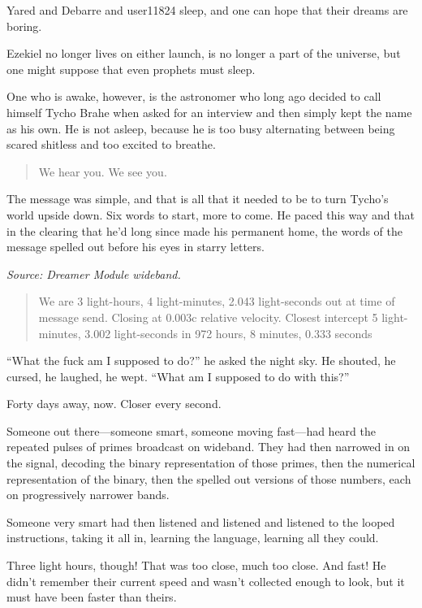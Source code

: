 Yared and Debarre and user11824 sleep, and one can hope that their dreams are boring.

Ezekiel no longer lives on either launch, is no longer a part of the universe, but one might suppose that even prophets must sleep.

One who is awake, however, is the astronomer who long ago decided to call himself Tycho Brahe when asked for an interview and then simply kept the name as his own. He is not asleep, because he is too busy alternating between being scared shitless and too excited to breathe.

\begin{quote}
We hear you. We see you.
\end{quote}

\noindent The message was simple, and that is all that it needed to be to turn Tycho's world upside down. Six words to start, more to come. He paced this way and that in the clearing that he'd long since made his permanent home, the words of the message spelled out before his eyes in starry letters.

\emph{Source: Dreamer Module wideband.}

\begin{quote}
We are 3 light-hours, 4 light-minutes, 2.043 light-seconds out at time of message send. Closing at 0.003c relative velocity. Closest intercept 5 light-minutes, 3.002 light-seconds in 972 hours, 8 minutes, 0.333 seconds
\end{quote}

\noindent ``What the fuck am I supposed to do?'' he asked the night sky. He shouted, he cursed, he laughed, he wept. ``What am I supposed to do with this?''

Forty days away, now. Closer every second.

Someone out there---someone smart, someone moving fast---had heard the repeated pulses of primes broadcast on wideband. They had then narrowed in on the signal, decoding the binary representation of those primes, then the numerical representation of the binary, then the spelled out versions of those numbers, each on progressively narrower bands.

Someone very smart had then listened and listened and listened to the looped instructions, taking it all in, learning the language, learning all they could.

Three light hours, though! That was too close, much too close. And fast! He didn't remember their current speed and wasn't collected enough to look, but it must have been faster than theirs.

